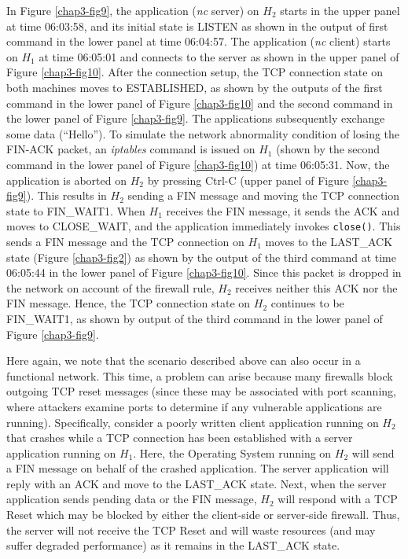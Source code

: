 \begin{multicols}{2}
In Figure \ref{chap3-fig9}, the application (\textit{nc} server) on $H_{2}$ starts in the upper panel at time 06:03:58, and its initial state is LISTEN as shown in the output of first command in the lower panel at time 06:04:57. The application (\textit{nc} client) starts on $H_{1}$ at time 06:05:01 and connects to the server as shown in the upper panel of Figure \ref{chap3-fig10}. After the connection setup, the TCP connection state on both machines moves to ESTABLISHED, as shown by the outputs of the first command in the lower panel of Figure \ref{chap3-fig10} and the second command in the lower panel of Figure \ref{chap3-fig9}. The applications subsequently exchange some data (``Hello''). To simulate the network abnormality condition of losing the FIN-ACK packet, an \textit{iptables} command is issued on $H_{1}$ (shown by the second command in the lower panel of Figure \ref{chap3-fig10}) at time 06:05:31. Now, the application is aborted on $H_{2}$ by pressing Ctrl-C (upper panel of Figure \ref{chap3-fig9}). This results in $H_{2}$ sending a FIN message and moving the TCP connection state to FIN\_WAIT1. When $H_{1}$ receives the FIN message, it sends the ACK and moves to CLOSE\_WAIT, and the application immediately invokes \lstinline|close()|. This sends a FIN message and the TCP connection on $H_{1}$ moves to the LAST\_ACK state (Figure \ref{chap3-fig2}) as shown by the output of the third command at time 06:05:44 in the lower panel of Figure \ref{chap3-fig10}. Since this packet is dropped in the network on account of the firewall rule, $H_{2}$ receives neither this ACK nor the FIN message. Hence, the TCP connection state on $H_{2}$ continues to be FIN\_WAIT1, as shown by output of the third command in the lower panel of Figure \ref{chap3-fig9}.

Here again, we note that the scenario described above can also occur in a functional network. This time, a problem can arise because many firewalls block outgoing TCP reset messages (since these may be associated with port scanning, where attackers examine ports to determine if any vulnerable applications are running). Specifically, consider a poorly written client application running on $H_{2}$ that crashes while a TCP connection has been established with a server application running on $H_{1}$. Here, the Operating System running on $H_{2}$ will send a FIN message on behalf of the crashed application. The server application will reply with an ACK and move to the LAST\_ACK state. Next, when the server application sends pending data or the FIN message, $H_{2}$ will respond with a TCP Reset which may be blocked by either the client-side or server-side firewall. Thus, the server will not receive the TCP Reset and will waste resources (and may suffer degraded performance) as it remains in the LAST\_ACK state.
\end{multicols}

